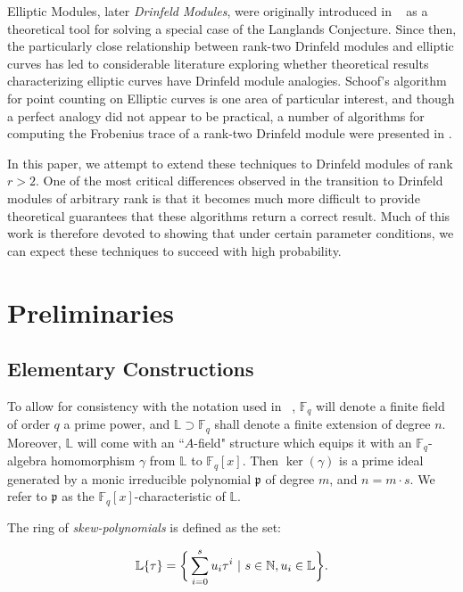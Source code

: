 \documentclass[sigconf]{acmart}
\newcommand{\F}{\mathbb{F}}
\newcommand{\N}{\mathbb{N}}
\renewcommand{\L}{\mathbb{L}}
\begin{document}
Elliptic Modules, later \textit{Drinfeld Modules}, were originally introduced in ~\cite{Drinfeld74} as a theoretical tool for solving a special case of the Langlands Conjecture. Since then, the particularly close relationship between rank-two Drinfeld modules and elliptic curves has led to considerable literature exploring whether theoretical results characterizing elliptic curves have Drinfeld module analogies. Schoof's algorithm for point counting on Elliptic curves is one area of particular interest, and though a perfect analogy did not appear to be practical, a number of algorithms for computing the Frobenius trace of a rank-two Drinfeld module were presented in \cite{MuslehSchost}.

In this paper, we attempt to extend these techniques to Drinfeld modules of rank $r > 2$. One of the most critical differences observed in the transition to Drinfeld modules of arbitrary rank is that it becomes much more difficult to provide theoretical guarantees that these algorithms return a correct result. Much of this work is therefore devoted to showing that under certain parameter conditions, we can expect these techniques to succeed with high probability. 

\section{Preliminaries}

\subsection{Elementary Constructions}
To allow for consistency with the notation used in ~\cite{MuslehSchost}, $\F_q$ will denote a finite field of order $q$ a prime power, and $\L \supset \F_q$ shall denote a finite extension of degree $n$. Moreover, $\L$ will come with an ``$A$-field" structure which equips it with an $\F_q$-algebra homomorphism $\gamma$ from $ \L$ to $\F_q[x]$. Then $\ker(\gamma)$ is a prime ideal generated by a monic irreducible polynomial $\mathfrak{p}$ of degree $m$, and $n = m \cdot s$. We refer to $\mathfrak{p}$ as the $\mathbb{F}_q[x]$-characteristic of $\L$.

The ring of \textit{skew-polynomials} is defined as the set:

\begin{align*}
    \L\{\tau\} = \bigg\{ \sum_{i=0}^su_i\tau^i \textnormal{ | } s \in \N, u_i \in \L \bigg\}.
\end{align*}
\end{document}
